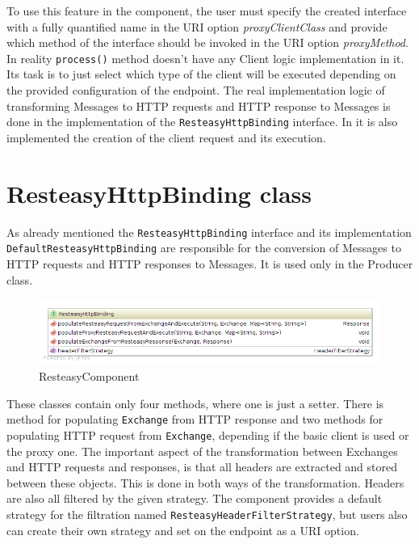 \documentclass[12pt,final,oneside]{fithesis2}
\begin{document}
To use this feature in the component, the user must specify the created interface with a fully quantified name in the URI option \textit{proxyClientClass} and provide which method of the interface should be invoked in the URI option \textit{proxyMethod}. In reality \texttt{process()} method doesn't have any Client logic implementation in it. Its task is to just select which type of the client will be executed depending on the provided configuration of the endpoint. The real implementation logic of transforming Messages to HTTP requests and HTTP response to Messages is done in the implementation of the \texttt{ResteasyHttpBinding} interface. In it is also implemented the creation of the client request and its execution.




\section{ResteasyHttpBinding class}
As already mentioned the \texttt{ResteasyHttpBinding} interface and its implementation \texttt{DefaultResteasyHttpBinding} are responsible for the conversion of Messages to HTTP requests and HTTP responses to Messages. It is used only in the Producer class. 

\begin{figure}[!h]
\centering
\includegraphics[width=1.0\linewidth]{images/binding.png}
\caption{ResteasyComponent}
\label{comp}
\end{figure}


These classes contain only four methods, where one is just a setter. There is method for populating \texttt{Exchange} from HTTP response and two methods for populating HTTP request from \texttt{Exchange}, depending if the basic client is used or the proxy one. The important aspect of the transformation between Exchanges and HTTP requests and responses, is that all headers are extracted and stored between these objects. This is done in both ways of the transformation. Headers are also all filtered by the given strategy. The component provides a default strategy for the filtration named \texttt{ResteasyHeaderFilterStrategy}, but users also can create their own strategy and set on the endpoint as a URI option.
\end{document}
